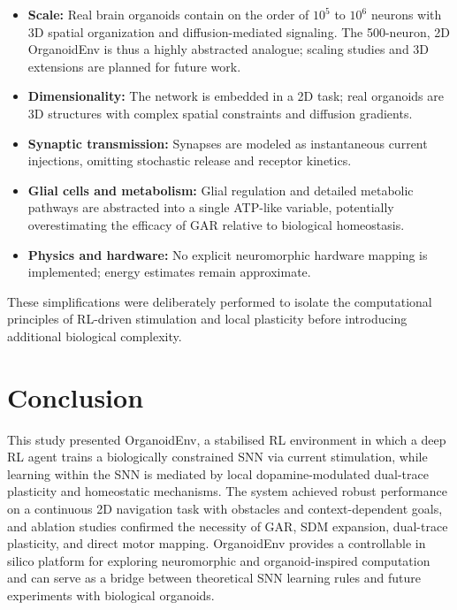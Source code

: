 \documentclass[journal]{IEEEtran}
\begin{document}
\begin{itemize}
    \item \textbf{Scale:} Real brain organoids contain on the order of $10^5$ to $10^6$ neurons with 3D spatial organization and diffusion-mediated signaling. The 500-neuron, 2D OrganoidEnv is thus a highly abstracted analogue; scaling studies and 3D extensions are planned for future work.
    \item \textbf{Dimensionality:} The network is embedded in a 2D task; real organoids are 3D structures with complex spatial constraints and diffusion gradients.
    \item \textbf{Synaptic transmission:} Synapses are modeled as instantaneous current injections, omitting stochastic release and receptor kinetics.
    \item \textbf{Glial cells and metabolism:} Glial regulation and detailed metabolic pathways are abstracted into a single ATP-like variable, potentially overestimating the efficacy of GAR relative to biological homeostasis.
    \item \textbf{Physics and hardware:} No explicit neuromorphic hardware mapping is implemented; energy estimates remain approximate.
\end{itemize}

These simplifications were deliberately performed to isolate the computational principles of RL-driven stimulation and local plasticity before introducing additional biological complexity.

\section{Conclusion}

This study presented OrganoidEnv, a stabilised RL environment in which a deep RL agent trains a biologically constrained SNN via current stimulation, while learning within the SNN is mediated by local dopamine-modulated dual-trace plasticity and homeostatic mechanisms. 
The system achieved robust performance on a continuous 2D navigation task with obstacles and context-dependent goals, and ablation studies confirmed the necessity of GAR, SDM expansion, dual-trace plasticity, and direct motor mapping. 
OrganoidEnv provides a controllable in silico platform for exploring neuromorphic and organoid-inspired computation and can serve as a bridge between theoretical SNN learning rules and future experiments with biological organoids.
\end{document}
